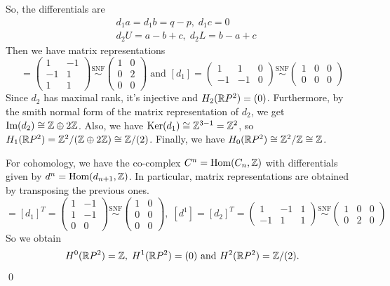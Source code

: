 So, the differentials are 
\begin{equation}
    \begin{aligned}
        &d_1a = d_1b = q-p,\;d_1c=0\\
        &d_2 U = a-b+c,\;d_2L = b-a +c 
    \end{aligned}
\end{equation}
Then we have matrix representations 
\begin{equation}
    [d_2]=\begin{pmatrix}
        1&-1\\-1&1\\1&1
    \end{pmatrix}\overset{\text{SNF}}{\sim}
    \begin{pmatrix}
        1&0\\0&2\\0&0
    \end{pmatrix}\;\text{and }
    [d_1]=\begin{pmatrix}
        1&1&0\\-1&-1&0
    \end{pmatrix}\overset{\text{SNF}}{\sim}
    \begin{pmatrix}
        1&0&0\\0&0&0
    \end{pmatrix}
\end{equation}
Since $d_2$ has maximal rank, it's injective and $H_2(\mathbb{R} P^2)=(0)$. Furthermore, by the smith normal form of 
the matrix representation of $d_2$, we get $\text{Im}(d_2)\cong\mathbb{Z}\oplus2\mathbb{Z}$. Also, we have 
$\text{Ker}(d_1)\cong\mathbb{Z}^{3-1}=\mathbb{Z}^2$, so $H_1(\mathbb{R} P^2)=\mathbb{Z}^2/(\mathbb{Z}\oplus2\mathbb{Z})\cong \mathbb{Z}/(2)$. Finally, we have 
$H_0(\mathbb{R} P^2)\cong \mathbb{Z}^2/\mathbb{Z} \cong \mathbb{Z}$.\par 

For cohomology, we have the co-complex $C^n=\text{Hom}(C_n,\mathbb{Z})$ with differentials given by 
$d^n=\text{Hom}(d_{n+1},\mathbb{Z})$. In particular, matrix representations are obtained by transposing the previous ones.
\begin{equation}
    [d^0]=[d_1]^T = \begin{pmatrix}
        1&-1\\1&-1\\0&0
    \end{pmatrix}\overset{\text{SNF}}{\sim}
    \begin{pmatrix}
        1&0\\0&0\\0&0
    \end{pmatrix},\;
    [d^1]=[d_2]^T=\begin{pmatrix}
        1&-1&1\\-1&1&1
    \end{pmatrix}\overset{\text{SNF}}{\sim}
    \begin{pmatrix}
        1&0&0\\0&2&0
    \end{pmatrix}
\end{equation}
So we obtain
\begin{equation}
    H^0(\mathbb{R} P^2)=\mathbb{Z},\; H^1(\mathbb{R} P^2)=(0)\text{ and } H^2(\mathbb{R} P^2)=\mathbb{Z}/(2).
\end{equation}
\qed


